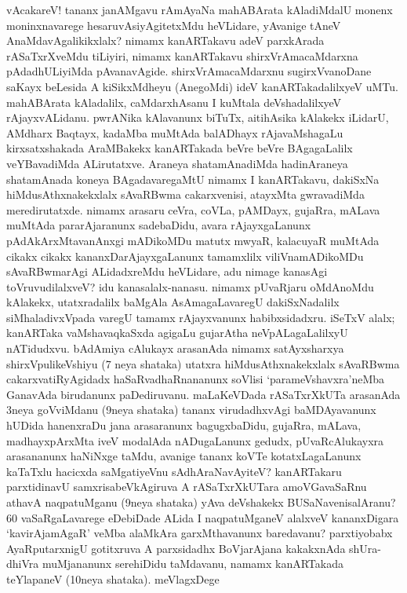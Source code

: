 \documentclass[11pt,a4size]{article}
\begin{document}
vAcakareV! tananx janAMgavu rAmAyaNa mahABArata kAladiMdalU monenx
moninxnavarege hesaruvAsi\-yAgitetxMdu heVLidare, yAvanige tAneV
AnaMdavAgalikikxlalx? nimamx kanARTakavu adeV parxkArada rASaTxrXveMdu
tiLiyiri, nimamx kanARTakavu shirxVrAmacaMdarxna pAdadhULiyiMda
pAvanavAgide. shirxVrAmacaMdarxnu sugirxVvanoDane saKayx beLesida A
kiSikxMdheyu (AnegoMdi) ideV kanARTakadalilxyeV uMTu. mahABArata
kAladalilx, caMdarxhAsanu I kuMtala deVshadalilxyeV
rAjayxvALidanu. pwrANika kAlavanunx biTuTx, aitihAsika kAlakekx
iLidarU, AMdharx Baqtayx, kadaMba muMtAda balADhayx rAjavaMshagaLu
kirxsatxshakada AraMBakekx kanARTakada beVre beVre BAgagaLalilx
veYBavadiMda ALirutatxve. Araneya shatamAnadiMda hadinAraneya
shatamAnada koneya BAgadavaregaMtU nimamx I kanARTakavu, dakiSxNa
hiMdusAthxnakekxlalx sAvaRBwma cakarxvenisi, atayxMta gwravadiMda
meredirutatxde. nimamx arasaru ceVra, coVLa, pAMDayx, gujaRra, mALava
muMtAda pararAjaranunx sadebaDidu, avara rAjayxgaLanunx
pAdAkArxMtavanAnxgi mADikoMDu matutx mwyaR, kalacuyaR muMtAda cikakx
cikakx kananxDarAjayxgaLanunx tamamxlilx viliVnamADikoMDu
sAvaRBwmarAgi ALidadxreMdu heVLidare, adu nimage kanasAgi
toVruvudilalxveV? idu kanasalalx-nanasu. nimamx pUvaRjaru oMdAnoMdu
kAlakekx, utatxradalilx baMgAla AsAmagaLavaregU dakiSxNadalilx
siMhaladivxVpada varegU tamamx rAjayxvanunx habibxsidadxru. iSeTxV
alalx; kanARTaka vaMshavaqkaSxda agigaLu gujarAtha neVpALagaLalilxyU
nATidudxvu. bAdAmiya cAlukayx arasanAda nimamx satAyxsharxya
shirxVpulikeVshiyu (7 neya shataka) utatxra hiMdusAthxnakekxlalx
sAvaRBwma cakarxvatiRyAgidadx haSaRvadhaRnananunx soVlisi
`parameVshavxra'neMba GanavAda birudanunx paDediruvanu. maLaKeVDada
rASaTxrXkUTa arasanAda 3neya goVviMdanu (9neya shataka) tananx
virudadhxvAgi baMDAyavanunx hUDida hanenxraDu jana arasaranunx
bagugxbaDidu, gujaRra, mALava, madhayxpArxMta iveV modalAda
nADugaLanunx gedudx, pUvaRcAlukayxra arasananunx haNiNxge taMdu,
avanige tananx koVTe kotatxLagaLanunx kaTaTxlu hacicxda saMgatiyeVnu
sAdhAraNavAyiteV? kanARTakaru parxtidinavU samxrisabeVkAgiruva A
rASaTxrXkUTara amoVGavaSaRnu athavA naqpatuMganu (9neya shataka) yAva
deVshakekx BUSaNavenisalAranu? 60 vaSaRgaLavarege eDebiDade ALida I
naqpatuMganeV alalxveV kananxDigara `kavirAjamAgaR' veMba alaMkAra
garxMthavanunx baredavanu? parxtiyobabx AyaRputarxnigU gotitxruva A
parxsidadhx BoVjarAjana kakakxnAda shUra-dhiVra muMjananunx serehiDidu
taMdavanu, namamx kanARTakada teYlapaneV (10neya shataka). meVlagxDege
\end{document}

